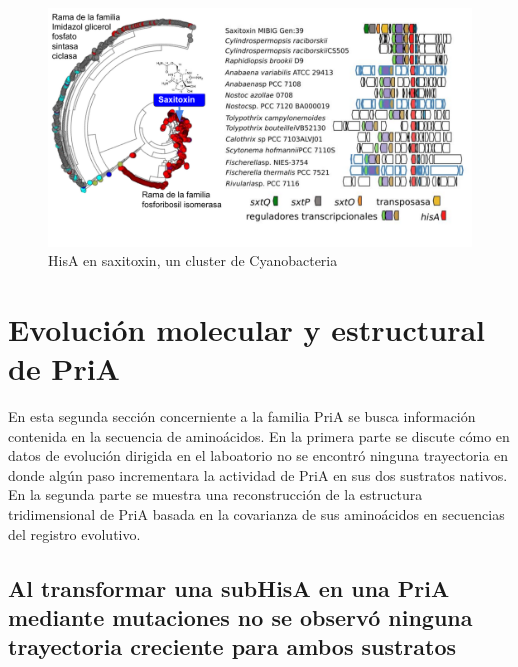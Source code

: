 \documentclass[12pt,twoside]{reedthesis}
\begin{document}
  \begin{figure}[h!tbp]
  \centering
  \includegraphics[angle = 0,scale = 0.7]{chapter4/CORASON/saxitoxin.pdf}
  \caption[HisA en saxitoxin, un cluster de Cyanobacteria ]{\footnotesize{HisA en saxitoxin, un cluster de Cyanobacteria }}
  \label{fig:saxitoxin}
  \end{figure}
  
  \section{Evolución molecular y estructural de
  PriA}\label{evolucion-molecular-y-estructural-de-pria}
  
  En esta segunda sección concerniente a la familia PriA se busca
  información contenida en la secuencia de aminoácidos. En la primera
  parte se discute cómo en datos de evolución dirigida en el laboatorio no
  se encontró ninguna trayectoria en donde algún paso incrementara la
  actividad de PriA en sus dos sustratos nativos. En la segunda parte se
  muestra una reconstrucción de la estructura tridimensional de PriA
  basada en la covarianza de sus aminoácidos en secuencias del registro
  evolutivo.
  
  \subsection{Al transformar una subHisA en una PriA mediante mutaciones
  no se observó ninguna trayectoria creciente para ambos
  sustratos}\label{al-transformar-una-subhisa-en-una-pria-mediante-mutaciones-no-se-observo-ninguna-trayectoria-creciente-para-ambos-sustratos}
  
\end{document}

